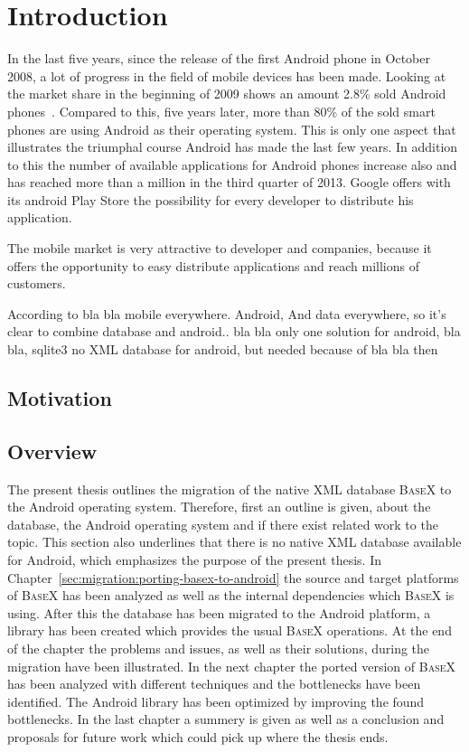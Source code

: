 \chapter{Introduction}
\label{cha:introduction}
In the last five years, since the release of the first Android phone in October 2008, a lot of progress in the field of mobile devices has been made.
Looking at the market share in the beginning of 2009 shows an amount 2.8\% sold Android phones~\cite{gandhewar2010google}.
Compared to this, five years later, more than 80\% of the sold smart phones are using Android as their operating system.
This is only one aspect that illustrates the triumphal course Android has made the last few years.
In addition to this the number of available applications for Android phones increase also and has reached more than a million in the third quarter of 2013.
Google offers with its android Play Store the possibility for every developer to distribute his application.

The mobile market is very attractive to developer and companies, because it offers the opportunity to easy distribute applications and reach millions of customers.


According to bla bla mobile everywhere. Android, And data everywhere, so it's clear to combine database and android.. bla bla
only one solution for android, bla bla, sqlite3
no XML database for android, but needed because of bla bla
then 

\section{Motivation}
\label{sec:introduction:motivation}

\section{Overview}
\label{sec:overview}
The present thesis outlines the migration of the native XML database \textsc{BaseX} to the Android operating system.
Therefore, first an outline is given, about the database, the Android operating system and if there exist related work to the topic.
This section also underlines that there is no native XML database available for Android, which emphasizes the purpose of the present thesis.
In Chapter~\ref{sec:migration:porting-basex-to-android} the source and target platforms of \textsc{BaseX} has been analyzed as well as the internal dependencies which \textsc{BaseX} is using.
After this the database has been migrated to the Android platform, a library has been created which provides the usual \textsc{BaseX} operations.
At the end of the chapter the problems and issues, as well as their solutions, during the migration have been illustrated.
In the next chapter the ported version of \textsc{BaseX} has been analyzed with different techniques and the bottlenecks have been identified.
The Android library has been optimized by improving the found bottlenecks.
In the last chapter a summery is given as well as a conclusion and proposals for future work which could pick up where the thesis ends.


